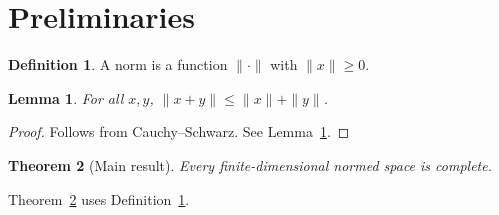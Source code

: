 \documentclass{article}
\newtheorem{theorem}{Theorem}[section]
\newtheorem{lemma}[theorem]{Lemma}
\theoremstyle{definition}
\newtheorem{definition}{Definition}
\begin{document}
\section{Preliminaries}
\begin{definition}\label{def:norm}
A norm is a function $\|\cdot\|$ with $\|x\| \ge 0$.
\end{definition}
\begin{lemma}\label{lem:tri}
For all $x,y$, $\|x+y\| \le \|x\| + \|y\|$.
\end{lemma}
\begin{proof}
Follows from Cauchy--Schwarz. See Lemma~\ref{lem:tri}.
\end{proof}
\begin{theorem}[Main result]\label{thm:main}
Every finite-dimensional normed space is complete.
\end{theorem}
Theorem~\ref{thm:main} uses Definition~\ref{def:norm}.
\end{document}

